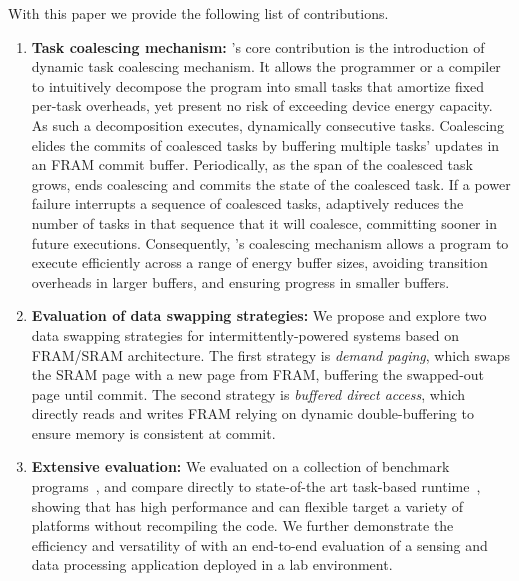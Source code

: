 With this paper we provide the following list of contributions.
%
\begin{enumerate}
%
\item {\bf Task coalescing mechanism:} \sys's core contribution is the introduction of dynamic task coalescing mechanism. It allows the programmer or a compiler to intuitively decompose the program into small tasks that amortize fixed per-task overheads, yet present no risk of exceeding device energy capacity. As such a decomposition executes,  dynamically consecutive tasks. Coalescing elides the commits of coalesced tasks by buffering multiple tasks' updates in an FRAM commit buffer. Periodically, as the span of the coalesced task grows, \sys ends coalescing and commits the state of the coalesced task. If a power failure interrupts a sequence of coalesced tasks, \sys adaptively reduces the number of tasks in that sequence that it will
coalesce, committing sooner in future executions. Consequently, \sys's coalescing mechanism allows a program to execute efficiently across a range of
energy buffer sizes, avoiding transition overheads in larger buffers, and
ensuring progress in smaller buffers.
%
%
\item {\bf Evaluation of data swapping strategies:} We propose and explore two data swapping strategies for intermittently-powered systems based on FRAM/SRAM architecture. The first strategy is {\em demand paging}, which swaps the SRAM page with a new page from FRAM, buffering the swapped-out page until commit. The second strategy is {\em buffered direct access}, which directly reads and writes FRAM relying on dynamic double-buffering to ensure memory is consistent at
commit. 
%
%
\item {\bf Extensive \sys evaluation:} We evaluated \sys on a collection of benchmark programs~\cite[Sec. 5]{chain}, and compare directly to state-of-the art task-based runtime~\cite{chain}, showing that \sys has high performance and can flexible target a variety of platforms without recompiling the code. We further demonstrate the efficiency and versatility of \sys with an end-to-end evaluation of a sensing and data processing application deployed in a lab environment. 
%
%
\end{enumerate}